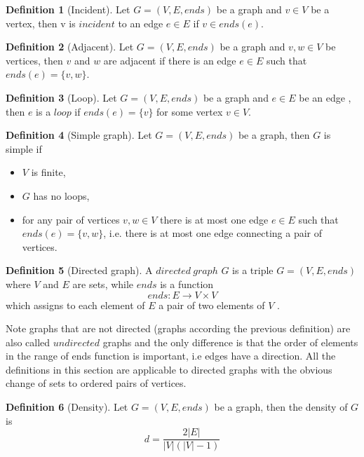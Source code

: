 \documentclass{report}
\theoremstyle{plain}
\theoremstyle{definition}
\newtheorem{definition}{Definition}
\theoremstyle{remark}
\begin{document}
\begin{definition}[Incident]
Let $G = (V, E, ends)$ be a graph and $v\in V$ be a vertex, then v is $incident$ to an edge $e \in E$ if $v \in ends(e)$.
\end{definition}

\begin{definition}[Adjacent]
Let $G = (V, E, ends)$ be a graph and $v,w\in V$ be vertices, then $v$ and $w$ are adjacent if there is an edge $ e \in E$ such that $ends(e) = \{v, w\}$.
\end{definition}

\begin{definition}[Loop]
Let $G = (V, E, ends)$ be a graph and $e \in E$ be an edge , then $e$ is a $loop$ if $ends(e) = \{v\}$ for some vertex $v \in V$.
\end{definition}

\begin{definition}[Simple graph]
Let $G = (V, E, ends)$ be a graph, then $G$ is simple if
\begin{itemize}
\item $V$ is finite,
\item $G$ has no loops,
\item for any pair of vertices $v,w \in V$ there is at most one edge $e \in E$ such that $ends(e) = \{v, w\}$, i.e. there is at most one edge connecting a pair of vertices.
\end{itemize}
\end{definition}

\begin{definition}[Directed graph]
A $directed \ graph$  $G$ is a triple $G = (V, E, ends)$ where $V$ and $E$ are sets, while $ends$ is a function 
  \begin{equation}
  ends:E\to V \times V
  \end{equation}
which assigns to each element of $E$ a pair of two elements of $V$ .
\end{definition}

Note graphs that are not directed (graphs according the previous definition) are also called $undirected$ graphs and the only difference is that the order of elements in the range of ends function is important, i.e edges have a direction. All the definitions in this section are applicable to directed graphs with the obvious change of sets to ordered pairs of vertices.

\begin{definition}[Density]

Let $G = (V, E, ends)$ be a graph, then the density of $G$ is 
  \begin{equation}
  d=\frac{2|E|}{|V|(|V|-1)}
  \end{equation}
\end{definition}
\end{document}
